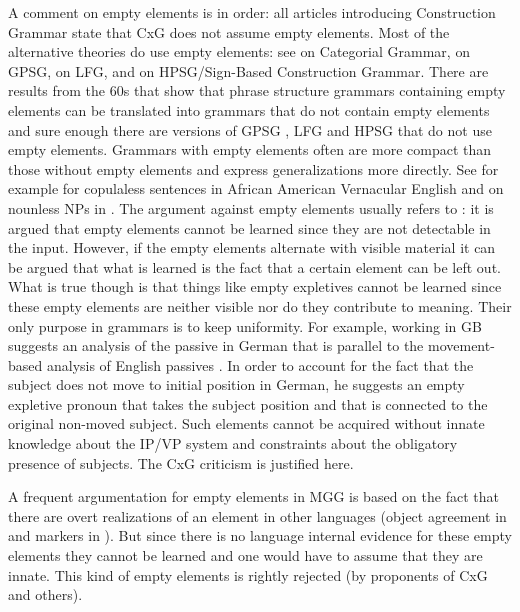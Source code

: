 \documentclass[output=paper]{langsci/langscibook}
\begin{document}
A comment on empty elements is in order: all articles introducing Construction Grammar state that
CxG does not assume empty elements. Most of the alternative theories do use empty elements: see
\citet{KoenigE99a-u} on Categorial Grammar, \citet*[]{GKPS85a} on GPSG, \citet[]{Bresnan2001a} on LFG,  and  on HPSG/Sign-Based
Construction Grammar. There are results from the 60s that show that phrase structure grammars
containing empty elements can be translated into grammars that do not contain empty elements
\citep*[, Lemma~4.1]{BHPS61a} and sure enough there are versions of GPSG \citep[--77]{Uszkoreit87a}, LFG \citep{KZ89a,DKK2001a-u} and HPSG \parencites{BMS2001a}[]{Sag2010b} that do not use empty elements. Grammars with empty elements often are more compact than
those without empty elements and express generalizations more directly. See for example
\citet{Bender2000a} for copulaless sentences in African American Vernacular
English and \citet{Mueller2004e} on nounless NPs in
. The argument against empty elements usually refers to : it
is argued that empty elements cannot be learned since they are not detectable in the input. However,
if the empty elements alternate with visible material it can be argued that what is learned is the
fact that a certain element can be left out. What is true though is that things like empty
expletives cannot be learned since these empty elements are neither visible nor do they contribute to
meaning. Their only purpose in grammars is to keep uniformity. For example, \citet{Grewendorf93}
working in GB suggests an analysis of the passive in German that is parallel to the movement-based analysis of English
passives \citep[]{Chomsky81a}. In order to account for the fact that the subject does not move to
initial position in German, he suggests an empty expletive pronoun that takes the subject position and that is connected to the original
non-moved subject. Such elements cannot be acquired without innate knowledge about the IP/VP system and
constraints about the obligatory presence of subjects. The CxG criticism is justified here.

A frequent argumentation for empty elements in MGG is based on the fact that there are overt
realizations of an element in other languages (\eg object agreement in  and  markers in
). But since there is no language internal evidence for these empty elements they cannot be
learned and one would have to assume that they are innate. This kind of empty elements is rightly
rejected (by proponents of CxG and others).
\end{document}
